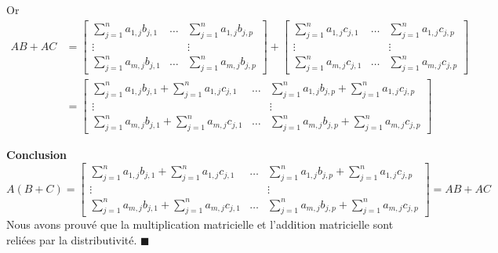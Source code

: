 \documentclass[12pt]{book}
\begin{document}
Or 
\begin{equation*}
\begin{split}
 AB+AC& =
    \begin{bmatrix}
    \sum\limits_{j=1}^na_{1,j}b_{j,1} & \ldots & \sum\limits_{j=1}^na_{1,j}b_{j,p}  \\
    \vdots & & \vdots \\
    \sum\limits_{j=1}^na_{m,j}b_{j,1}  & \ldots & \sum\limits_{j=1}^na_{m,j}b_{j,p}
    \end{bmatrix}+
    \begin{bmatrix}
    \sum\limits_{j=1}^na_{1,j}c_{j,1}& \ldots & \sum\limits_{j=1}^na_{1,j}c_{j,p}  \\
    \vdots & & \vdots \\
    \sum\limits_{j=1}^na_{m,j}c_{j,1} & \ldots & \sum\limits_{j=1}^na_{m,j}c_{j,p}
    \end{bmatrix}\\
    & =
    \begin{bmatrix}
    \sum\limits_{j=1}^na_{1,j}b_{j,1}+\sum\limits_{j=1}^na_{1,j}c_{j,1}& \ldots & \sum\limits_{j=1}^na_{1,j}b_{j,p}+\sum\limits_{j=1}^na_{1,j}c_{j,p}  \\
    \vdots & & \vdots \\
    \sum\limits_{j=1}^na_{m,j}b_{j,1} + \sum\limits_{j=1}^na_{m,j}c_{j,1} & \ldots & \sum\limits_{j=1}^na_{m,j}b_{j,p}+ \sum\limits_{j=1}^na_{m,j}c_{j,p}
    \end{bmatrix}
\end{split}
\end{equation*}

\textbf{Conclusion} 
\begin{equation*}
    A(B+C) = 
    \begin{bmatrix}
    \sum\limits_{j=1}^na_{1,j}b_{j,1}+\sum\limits_{j=1}^na_{1,j}c_{j,1}& \ldots & \sum\limits_{j=1}^na_{1,j}b_{j,p}+\sum\limits_{j=1}^na_{1,j}c_{j,p}  \\
    \vdots & & \vdots \\
    \sum\limits_{j=1}^na_{m,j}b_{j,1} + \sum\limits_{j=1}^na_{m,j}c_{j,1} & \ldots & \sum\limits_{j=1}^na_{m,j}b_{j,p}+ \sum\limits_{j=1}^na_{m,j}c_{j,p}
    \end{bmatrix}
    = AB + AC
\end{equation*}
Nous avons prouvé que la multiplication matricielle et l'addition matricielle sont reliées par la distributivité. \hfill $\blacksquare$
\end{document}
